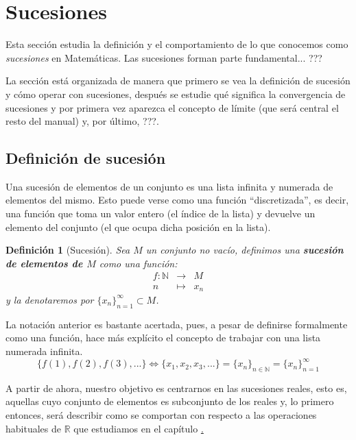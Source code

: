 \documentclass[10pt,a4paper,openright]{book}
\theoremstyle{break}
\newtheorem{defi}{Definición}[chapter]
\begin{document}
\section{Sucesiones}
Esta sección estudia la definición y el comportamiento de lo que conocemos como \textit{sucesiones} en Matemáticas. Las sucesiones forman parte fundamental... ???

La sección está organizada de manera que primero se vea la definición de sucesión y cómo operar con sucesiones, después se estudie qué significa la convergencia de sucesiones y por primera vez aparezca el concepto de límite (que será central el resto del manual) y, por último, ???.

\subsection{Definición de sucesión}
Una sucesión de elementos de un conjunto es una lista infinita y numerada de elementos del mismo. Esto puede verse como una función ``discretizada'', es decir, una función que toma un valor entero (el índice de la lista) y devuelve un elemento del conjunto (el que ocupa dicha posición en la lista).

\begin{defi}[Sucesión]
Sea $M$ un conjunto no vacío, definimos una \textbf{sucesión de elementos de $M$} como una función:
\begin{eqnarray*}
f: \mathbb N &\longrightarrow& M \\
n &\longmapsto& x_n
\end{eqnarray*}
y la denotaremos por $\{x_n\}_{n=1}^\infty\subset M$.
\end{defi}

La notación anterior es bastante acertada, pues, a pesar de definirse formalmente como una función, hace más explícito el concepto de trabajar con una lista numerada infinita.
\[
\{f(1),f(2),f(3), ...\}\Leftrightarrow \{x_1,x_2,x_3,...\}=\{x_n\}_{n\in \mathbb N}=\{x_n\}_{n=1}^{\infty}
\]

A partir de ahora, nuestro objetivo es centrarnos en las sucesiones reales, esto es, aquellas cuyo conjunto de elementos es subconjunto de los reales y, lo primero entonces, será describir como se comportan con respecto a las operaciones habituales de $\mathbb R$ que estudiamos en el capítulo \href{cap: numeros reales}.
\end{document}
